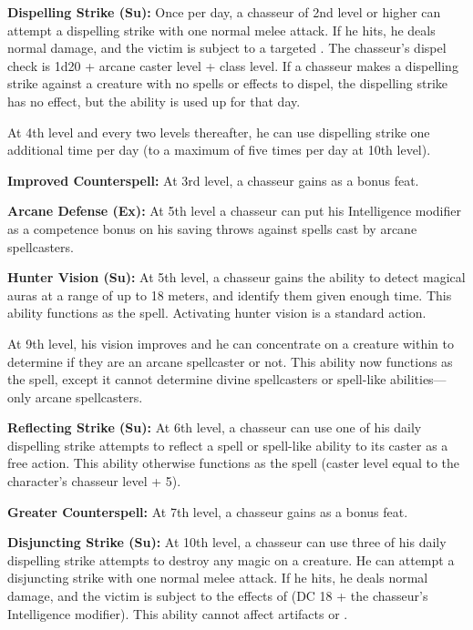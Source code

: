 {%



\textbf{Dispelling Strike (Su):} Once per day, a chasseur of 2nd level or higher can attempt a dispelling strike with one normal melee attack. If he hits, he deals normal damage, and the victim is subject to a targeted . The chasseur's dispel check is 1d20 + arcane caster level + class level. If a chasseur makes a dispelling strike against a creature with no spells or effects to dispel, the dispelling strike has no effect, but the ability is used up for that day.

At 4th level and every two levels thereafter, he can use dispelling strike one additional time per day (to a maximum of five times per day at 10th level).

\textbf{Improved Counterspell:} At 3rd level, a chasseur gains  as a bonus feat.

\textbf{Arcane Defense (Ex):} At 5th level a chasseur can put his Intelligence modifier as a competence bonus on his saving throws against spells cast by arcane spellcasters.

\textbf{Hunter Vision (Su):} At 5th level, a chasseur gains the ability to detect magical auras at a range of up to 18 meters, and identify them given enough time. This ability functions as the  spell. Activating hunter vision is a standard action.

At 9th level, his vision improves and he can concentrate on a creature within to determine if they are an arcane spellcaster or not. This ability now functions as the  spell, except it cannot determine divine spellcasters or spell-like abilities---only arcane spellcasters.

\textbf{Reflecting Strike (Su):} At 6th level, a chasseur can use one of his daily dispelling strike attempts to reflect a spell or spell-like ability to its caster as a free action. This ability otherwise functions as the  spell (caster level equal to the character's chasseur level + 5).

\textbf{Greater Counterspell:} At 7th level, a chasseur gains  as a bonus feat.

\textbf{Disjuncting Strike (Su):} At 10th level, a chasseur can use three of his daily dispelling strike attempts to destroy any magic on a creature. He can attempt a disjuncting strike with one normal melee attack. If he hits, he deals normal damage, and the victim is subject to the effects of  (DC 18 + the chasseur's Intelligence modifier). This ability cannot affect artifacts or .
}
